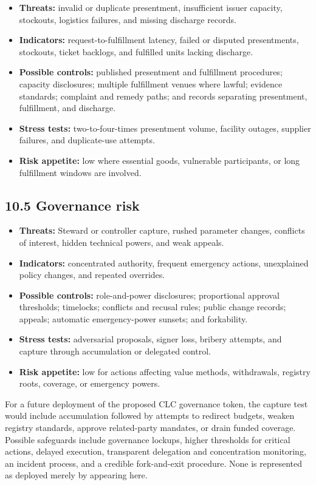 \documentclass[11pt]{article}
\begin{document}
\begin{itemize}[leftmargin=*]
\item \textbf{Threats:} invalid or duplicate presentment, insufficient issuer capacity, stockouts, logistics failures, and missing discharge records.
\item \textbf{Indicators:} request-to-fulfillment latency, failed or disputed presentments, stockouts, ticket backlogs, and fulfilled units lacking discharge.
\item \textbf{Possible controls:} published presentment and fulfillment procedures; capacity disclosures; multiple fulfillment venues where lawful; evidence standards; complaint and remedy paths; and records separating presentment, fulfillment, and discharge.
\item \textbf{Stress tests:} two-to-four-times presentment volume, facility outages, supplier failures, and duplicate-use attempts.
\item \textbf{Risk appetite:} low where essential goods, vulnerable participants, or long fulfillment windows are involved.
\end{itemize}
\subsection*{10.5 Governance risk}

\begin{itemize}[leftmargin=*]
\item \textbf{Threats:} Steward or controller capture, rushed parameter changes, conflicts of interest, hidden technical powers, and weak appeals.
\item \textbf{Indicators:} concentrated authority, frequent emergency actions, unexplained policy changes, and repeated overrides.
\item \textbf{Possible controls:} role-and-power disclosures; proportional approval thresholds; timelocks; conflicts and recusal rules; public change records; appeals; automatic emergency-power sunsets; and forkability.
\item \textbf{Stress tests:} adversarial proposals, signer loss, bribery attempts, and capture through accumulation or delegated control.
\item \textbf{Risk appetite:} low for actions affecting value methods, withdrawals, registry roots, coverage, or emergency powers.
\end{itemize}
For a future deployment of the proposed CLC governance token, the capture test would include accumulation followed by attempts to redirect budgets, weaken registry standards, approve related-party mandates, or drain funded coverage. Possible safeguards include governance lockups, higher thresholds for critical actions, delayed execution, transparent delegation and concentration monitoring, an incident process, and a credible fork-and-exit procedure. None is represented as deployed merely by appearing here.
\end{document}
